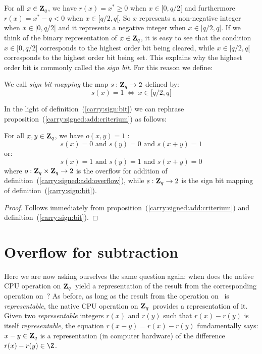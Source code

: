 \documentclass{article}
\newcommand{\zq}{\mbox{${\bf Z}_{q}$}}
\begin{document}
For all $x\in\zq$, we have $r(x)=x^{*}\geq 0$ when $x\in[0,q/2[$ 
and furthermore $r(x)=x^{*}-q < 0$ when $x\in[q/2,q[$. So $x$ represents a 
non-negative integer when $x\in[0,q/2[$ and it represents a 
negative integer when $x\in[q/2,q[$. If we think of the binary
representation of $x\in\zq$, it is easy to see that the condition
$x\in[0,q/2[$ corresponds to the highest order bit being cleared,
while $x\in[q/2,q[$ corresponds to the highest order bit being set.
This explains why the highest order bit is commonly called 
the {\em sign bit}. For this reason we define:

\begin{defin}\label{carry:sign:bit}
  We call {\em sign bit mapping} the map $s:\zq\rightarrow 2$ defined by:
    \[
      s(x) = 1\ \Leftrightarrow\ x\in[q/2,q[
    \]
\end{defin}

In the light of definition~(\ref{carry:sign:bit}) we can rephrase 
proposition~(\ref{carry:signed:add:criterium}) as follows:
\begin{prop}\label{carry:signed:add:criterium:2}
  For all $x,y\in\zq$, we have $o(x,y)=1$ \ifand:
  \[
    s(x)=0\mbox{\ and\ }s(y)=0\mbox{\ and\ }s(x+y)=1
  \]
or:
  \[
    s(x)=1\mbox{\ and\ }s(y)=1\mbox{\ and\ }s(x+y)=0
  \]
where $o:\zq\times\zq\rightarrow 2$ is the overflow for addition of 
  definition~(\ref{carry:signed:add:overflow}), while $s:\zq\rightarrow 2$
  is the sign bit mapping of definition~(\ref{carry:sign:bit}).
\end{prop}
\begin{proof}
  Follows immediately from proposition~(\ref{carry:signed:add:criterium})
  and definition~(\ref{carry:sign:bit}).
\end{proof}

\section{Overflow for subtraction}
Here we are now asking ourselves the same question again: when does the
native CPU operation on \zq\ yield a representation of the result from
the corresponding operation on \Z\,? As before, as long as the result 
from the operation on \Z\ is {\em representable}, the native CPU operation 
on \zq\ provides a representation of it. Given two {\em representable}
integers $r(x)$ and $r(y)$ such that $r(x)-r(y)$ is itself 
{\em representable}, the equation $r(x-y)=r(x)-r(y)$ fundamentally says:
$x-y\in\zq$ is a representation
(in computer hardware) of the difference $r(x)-r(y)\in\Z$. 
\end{document}
